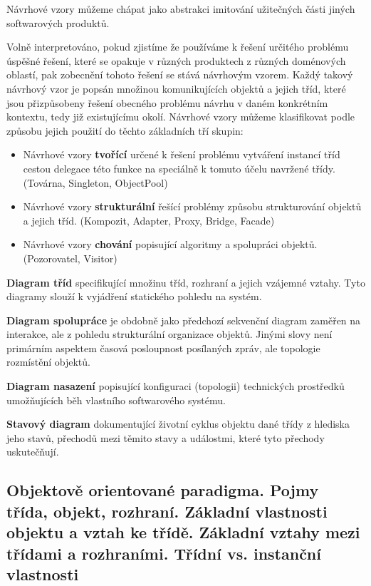 Návrhové vzory můžeme chápat jako abstrakci imitování užitečných části jiných softwarových produktů.

Volně interpretováno, pokud zjistíme že používáme k řešení určitého problému úspěšné řešení, které se opakuje v různých produktech z různých doménových oblastí, pak zobecnění tohoto řešení se stává návrhovým vzorem. Každý takový návrhový vzor je popsán množinou komunikujících objektů a jejich tříd, které jsou přizpůsobeny řešení obecného problému návrhu v daném konkrétním kontextu, tedy již existujícímu okolí. Návrhové vzory můžeme klasifikovat podle způsobu jejich použití do těchto základních tří skupin:
\begin{itemize}
\item Návrhové vzory \textbf{tvořící} určené k řešení problému vytváření instancí tříd cestou delegace této funkce na speciálně k tomuto účelu navržené třídy. (Továrna, Singleton, ObjectPool)
\item Návrhové vzory \textbf{strukturální} řešící problémy způsobu strukturování objektů a jejich tříd. (Kompozit, Adapter, Proxy, Bridge, Facade)
\item Návrhové vzory \textbf{chování} popisující algoritmy a spolupráci objektů. (Pozorovatel, Visitor)
\end{itemize}

\textbf{Diagram tříd} specifikující množinu tříd, rozhraní a jejich vzájemné vztahy. Tyto diagramy slouží k vyjádření statického pohledu na systém.

\textbf{Diagram spolupráce} je obdobně jako předchozí sekvenční diagram zaměřen na interakce, ale z pohledu strukturální organizace objektů. Jinými slovy není primárním aspektem časová posloupnost posílaných zpráv, ale topologie rozmístění objektů.

\textbf{Diagram nasazení} popisující konfiguraci (topologii) technických prostředků umožňujících běh vlastního softwarového systému.

\textbf{Stavový diagram} dokumentující životní cyklus objektu dané třídy z hlediska jeho stavů, přechodů mezi těmito stavy a událostmi, které tyto přechody uskutečňují.

\subsection[Objektové orientované paradigma]{Objektově orientované paradigma. Pojmy třída, objekt, rozhraní. Základní vlastnosti objektu a vztah ke třídě. Základní vztahy mezi třídami a rozhraními. Třídní vs. instanční vlastnosti}
